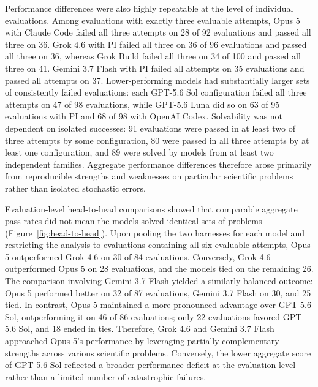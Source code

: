 \documentclass[10pt,letterpaper]{article}
\begin{document}
Performance differences were also highly repeatable at the level of individual evaluations. Among evaluations with exactly three evaluable attempts, Opus 5 with Claude Code failed all three attempts on 28 of 92 evaluations and passed all three on 36. Grok 4.6 with PI failed all three on 36 of 96 evaluations and passed all three on 36, whereas Grok Build failed all three on 34 of 100 and passed all three on 41. Gemini 3.7 Flash with PI failed all attempts on 35 evaluations and passed all attempts on 37. Lower-performing models had substantially larger sets of consistently failed evaluations: each GPT-5.6 Sol configuration failed all three attempts on 47 of 98 evaluations, while GPT-5.6 Luna did so on 63 of 95 evaluations with PI and 68 of 98 with OpenAI Codex. Solvability was not dependent on isolated successes: 91 evaluations were passed in at least two of three attempts by some configuration, 80 were passed in all three attempts by at least one configuration, and 89 were solved by models from at least two independent families. Aggregate performance differences therefore arose primarily from reproducible strengths and weaknesses on particular scientific problems rather than isolated stochastic errors.

Evaluation-level head-to-head comparisons showed that comparable aggregate pass rates did not mean the models solved identical sets of problems (Figure~\ref{fig:head-to-head}). Upon pooling the two harnesses for each model and restricting the analysis to evaluations containing all six evaluable attempts, Opus 5 outperformed Grok 4.6 on 30 of 84 evaluations. Conversely, Grok 4.6 outperformed Opus 5 on 28 evaluations, and the models tied on the remaining 26. The comparison involving Gemini 3.7 Flash yielded a similarly balanced outcome: Opus 5 performed better on 32 of 87 evaluations, Gemini 3.7 Flash on 30, and 25 tied. In contrast, Opus 5 maintained a more pronounced advantage over GPT-5.6 Sol, outperforming it on 46 of 86 evaluations; only 22 evaluations favored GPT-5.6 Sol, and 18 ended in ties. Therefore, Grok 4.6 and Gemini 3.7 Flash approached Opus 5's performance by leveraging partially complementary strengths across various scientific problems. Conversely, the lower aggregate score of GPT-5.6 Sol reflected a broader performance deficit at the evaluation level rather than a limited number of catastrophic failures.

\EndBody
\end{document}
